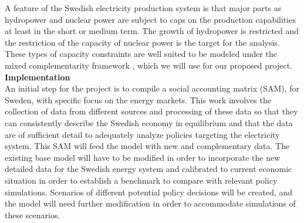 A feature of the Swedish electricity production system is that major parts as hydropower and nuclear power are subject to caps on the production capabilities at least in the short or medium term. The growth of hydropower is restricted and the restriction of the capacity of nuclear power is the target for the analysis. These types of capacity constraints are well suited to be modeled under the mixed complementarity framework \citep{raey}, which we will use for our proposed project.\\

\textbf{Implementation}\\
An initial step for the project is to compile a social accounting matrix (SAM), for Sweden, with specific focus on the energy markets. This work involves the collection of data from different sources and processing of these data so that they can consistently describe the Swedish economy in equilibrium and that the data are of sufficient detail to adequately analyze policies targeting the electricity system. This SAM will feed the model with new and complementary data.
The existing base model will have to be modified in order to incorporate the new detailed data for the Swedish energy system and calibrated to current economic situation in order to establish a benchmark to compare with relevant policy simulations. Scenarios of different potential policy decisions will be created, and the model will need further modification in order to accommodate simulations of these scenarios.

